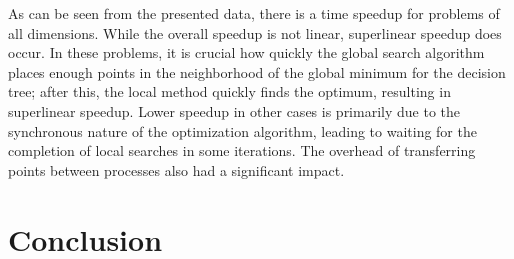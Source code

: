 \documentclass[runningheads]{llncs}
\begin{document}

As can be seen from the presented data, there is a time speedup for problems of all dimensions. While the overall speedup is not linear, superlinear speedup does occur. In these problems, it is crucial how quickly the global search algorithm places enough points in the neighborhood of the global minimum for the decision tree; after this, the local method quickly finds the optimum, resulting in superlinear speedup. Lower speedup in other cases is primarily due to the synchronous nature of the optimization algorithm, leading to waiting for the completion of local searches in some iterations. The overhead of transferring points between processes also had a significant impact.









\section{Conclusion} 
\end{document}
